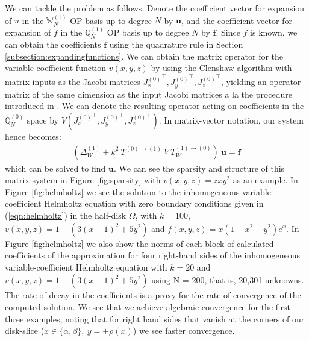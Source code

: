 \documentclass[11pt, oneside]{article}   	%
\newcommand{\bstodo}{\todo[color=pink]}
\newcommand{\bigscop}{{\mathbb{Q}}}
\newcommand{\bigWNi}{\mathbb{W}_N^{(1)}}
\newcommand{\bigscopi}{\bigscop^{(1)}}
\newcommand{\bigscopNi}{\bigscopi_{N}}
\newcommand{\bigscopo}{\bigscop^{(0)}}
\newcommand{\bigscopNo}{\bigscopo_{N}}
\begin{document}
We can tackle the problem as follows. Denote the coefficient vector for expansion of $u$ in the $\bigWNi$ OP basis up to degree $N$ by $\mathbf{u}$, and the coefficient vector for expansion of $f$ in the $\bigscopNi$ OP basis up to degree $N$ by $\mathbf{f}$. Since $f$ is known, we can obtain  the coefficients $\mathbf{f}$ using the quadrature rule in Section \ref{subsection:expandingfunctions}. We can obtain the matrix operator for the variable-coefficient function $v(x,y,z)$ by using the Clenshaw algorithm with matrix inputs as the Jacobi matrices ${J_x^{(0)}}^\top, {J_y^{(0)}}^\top, {J_z^{(0)}}^\top$, yielding an operator matrix of the same dimension as the input Jacobi matrices a la the procedure introduced in \cite{olver2019triangle}. We can denote the resulting operator acting on coefficients in the $\bigscopNo$ space by $V({J_x^{(0)}}^\top, {J_y^{(0)}}^\top, {J_z^{(0)}}^\top)$. In matrix-vector notation, our system hence becomes:
\begin{align*}
    (\Delta_W^{(1)} + k^2 \:T^{(0)\to(1)} \: V \: T_W^{(1)\to(0)}) \: \mathbf{u} = \mathbf{f}
\end{align*}
which can be solved to find $\mathbf{u}$. We can see the sparsity and structure of this matrix system in Figure \ref{fig:sparsity} with $v(x,y,z) = zxy^2$ as an example. In Figure \ref{fig:helmholtz} we see the solution to the inhomogeneous variable-coefficient Helmholtz equation with zero boundary conditions given in (\ref{eqn:helmholtz}) in the half-disk $\Omega$, with $k=100$, $v(x,y,z) = 1 - (3(x-1)^2 + 5y^2)$ and $f(x,y,z) = x(1-x^2-y^2)e^x$. In Figure \ref{fig:helmholtz} we also show the norms of each block of calculated coefficients of the approximation for four right-hand sides of the inhomogeneous variable-coefficient Helmholtz equation with $k=20$ and $v(x,y,z) = 1 - (3(x-1)^2 + 5y^2)$ using N = 200, that is, 20,301 unknowns. The rate of decay in the coefficients is a proxy for the rate of convergence of the computed solution. We see that we achieve algebraic convergence for the first three examples, noting that for right hand sides that vanish at the corners of our disk-slice ($x\in\{\alpha,\beta\}, \: y = \pm \rho(x)$) we see faster convergence. \bstodo{get figs and update the comments here}

\end{document}
